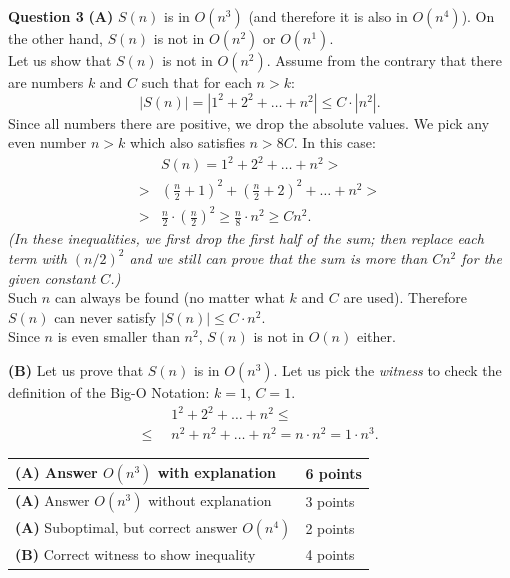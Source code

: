 \documentclass[jou]{apa6}
\begin{document}
\vspace{10pt}
{\bf Question 3}
{\bf (A)} $S(n)$ is in $O(n^3)$ (and therefore it is also in $O(n^4)$). 
On the other hand, $S(n)$ is not in $O(n^2)$ or $O(n^1)$.\\
Let us show that $S(n)$ is not in $O(n^2)$. Assume from the contrary
that there are numbers $k$ and $C$ such that for each $n > k$:
$$|S(n)| = |1^2 + 2^2 + \ldots + n^2| \leq C \cdot |n^2|.$$
Since all numbers there are positive, we drop the absolute values. 
We pick any even number $n > k$ which also satisfies $n > 8C$. In this case:
\begin{align}
 & S(n) = 1^2 + 2^2 + \ldots + n^2 > \nonumber \\
> & \left( \frac{n}{2} + 1 \right)^2 + \left( \frac{n}{2} + 2 \right)^2 + \ldots + n^2 > \nonumber \\
> & \frac{n}{2} \cdot \left( \frac{n}{2} \right)^2 \geq \frac{n}{8} \cdot n^2 \geq C n^2. \nonumber 
\end{align}
{\em (In these inequalities, we first drop the first half of the sum; 
then replace each term with $(n/2)^2$ and we still can prove that the sum is more than $Cn^2$ 
for the given constant $C$.)}\\
Such $n$ can always be found (no matter what $k$ and $C$ are used). 
Therefore $S(n)$ can never satisfy $|S(n)| \leq C \cdot n^2$.\\
Since $n$ is even smaller than $n^2$, $S(n)$ is not in $O(n)$ either. 

{\bf (B)} Let us prove that $S(n)$ is in $O(n^3)$. 
Let us pick the {\em witness} to check the definition of the Big-O Notation: 
$k = 1$, $C = 1$. 
\begin{align}
     & 1^2 + 2^2 + \ldots + n^2 \leq \nonumber \\
\leq\;\; & n^2 + n^2 + \ldots + n^2=  n \cdot n^2 = 1 \cdot n^3. \nonumber
\end{align}

{\footnotesize
\begin{tabular}{|l|l|} \hline
{\bf (A)} Answer $O(n^3)$ with explanation & 6 points \\ \hline
{\bf (A)} Answer $O(n^3)$ without explanation & 3 points \\ \hline
{\bf (A)} Suboptimal, but correct answer $O(n^4)$ & 2 points \\ \hline
{\bf (B)} Correct witness to show inequality & 4 points \\ \hline
\end{tabular}
}
\end{document}
